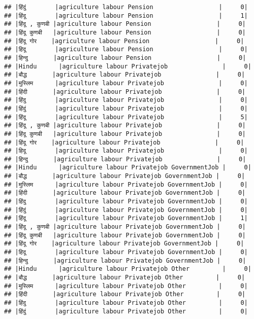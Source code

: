 \documentclass[
]{article}
\begin{document}
\begin{verbatim}
## |हिंदुं        |agriculture labour Pension                  |     0|
## |हिंदू        |agriculture labour Pension                  |     1|
## |हिंदू , कुणबी |agriculture labour Pension                  |     0|
## |हिंदू कुणबी   |agriculture labour Pension                  |     0|
## |हिंदू गोर    |agriculture labour Pension                  |     0|
## |हिदू        |agriculture labour Pension                  |     0|
## |हिन्दु       |agriculture labour Pension                  |     0|
## |Hindu      |agriculture labour Privatejob               |     0|
## |बौद्ध       |agriculture labour Privatejob               |     0|
## |मुस्लिम      |agriculture labour Privatejob               |     0|
## |हिंदी       |agriculture labour Privatejob               |     0|
## |हिंदु        |agriculture labour Privatejob               |     0|
## |हिंदुं        |agriculture labour Privatejob               |     0|
## |हिंदू        |agriculture labour Privatejob               |     5|
## |हिंदू , कुणबी |agriculture labour Privatejob               |     0|
## |हिंदू कुणबी   |agriculture labour Privatejob               |     0|
## |हिंदू गोर    |agriculture labour Privatejob               |     0|
## |हिदू        |agriculture labour Privatejob               |     0|
## |हिन्दु       |agriculture labour Privatejob               |     0|
## |Hindu      |agriculture labour Privatejob GovernmentJob |     0|
## |बौद्ध       |agriculture labour Privatejob GovernmentJob |     0|
## |मुस्लिम      |agriculture labour Privatejob GovernmentJob |     0|
## |हिंदी       |agriculture labour Privatejob GovernmentJob |     0|
## |हिंदु        |agriculture labour Privatejob GovernmentJob |     0|
## |हिंदुं        |agriculture labour Privatejob GovernmentJob |     0|
## |हिंदू        |agriculture labour Privatejob GovernmentJob |     1|
## |हिंदू , कुणबी |agriculture labour Privatejob GovernmentJob |     0|
## |हिंदू कुणबी   |agriculture labour Privatejob GovernmentJob |     0|
## |हिंदू गोर    |agriculture labour Privatejob GovernmentJob |     0|
## |हिदू        |agriculture labour Privatejob GovernmentJob |     0|
## |हिन्दु       |agriculture labour Privatejob GovernmentJob |     0|
## |Hindu      |agriculture labour Privatejob Other         |     0|
## |बौद्ध       |agriculture labour Privatejob Other         |     0|
## |मुस्लिम      |agriculture labour Privatejob Other         |     0|
## |हिंदी       |agriculture labour Privatejob Other         |     0|
## |हिंदु        |agriculture labour Privatejob Other         |     0|
## |हिंदुं        |agriculture labour Privatejob Other         |     0|

\end{verbatim}
\end{document}
